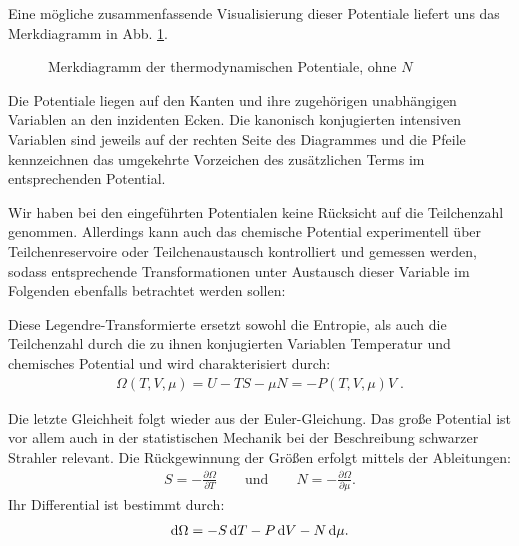 Eine mögliche zusammenfassende Visualisierung dieser Potentiale liefert uns das Merkdiagramm in Abb. \ref{fig:TDPotentialeMerk}.
\begin{figure}[htbp]
    \centering
    \tfigTDPotentialeMerk
    \caption{Merkdiagramm der thermodynamischen Potentiale, ohne $N$}
    \label{fig:TDPotentialeMerk}
\end{figure}
Die Potentiale liegen auf den Kanten und ihre zugehörigen unabhängigen Variablen an den inzidenten Ecken. Die kanonisch konjugierten intensiven Variablen sind jeweils auf der rechten Seite des Diagrammes und die Pfeile kennzeichnen das umgekehrte Vorzeichen des zusätzlichen Terms im entsprechenden Potential. 

Wir haben bei den eingeführten Potentialen keine Rücksicht auf die Teilchenzahl genommen.
Allerdings kann auch das chemische Potential experimentell über Teilchenreservoire oder Teilchenaustausch kontrolliert und gemessen werden, sodass entsprechende Transformationen unter Austausch dieser Variable im Folgenden ebenfalls betrachtet werden sollen:

\begin{formal}

    Diese Legendre-Transformierte ersetzt sowohl die Entropie, als auch die Teilchenzahl durch die zu ihnen konjugierten Variablen Temperatur und chemisches Potential und wird charakterisiert durch:
    \begin{align*}
        \boxed{\Omega (T,V,\mu)=U-TS-\mu N=-P(T,V,\mu)V}\;.
    \end{align*}
\end{formal}
Die letzte Gleichheit folgt wieder aus der Euler-Gleichung. Das große Potential ist vor allem auch in der statistischen Mechanik bei der Beschreibung schwarzer Strahler relevant. Die Rückgewinnung der Größen erfolgt mittels der Ableitungen:
    \begin{align*}
        S=-\frac{\partial \Omega}{\partial T}\qquad \mathrm{und}\qquad N=-\frac{\partial \Omega}{\partial \mu}.
    \end{align*}
    Ihr Differential ist bestimmt durch:
    \begin{align*}
        \mathop{}\!\mathrm{d} \Omega=-S\mathop{}\!\mathrm{d} T-P\mathop{}\!\mathrm{d} V-N \mathop{}\!\mathrm{d} \mu.
    \end{align*}

